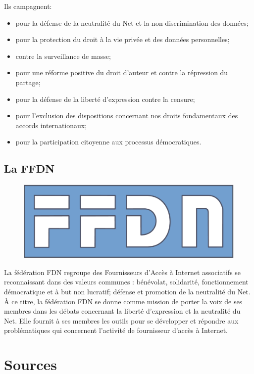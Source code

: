 \documentclass[a4paper,11pt,sf]{leaflet}
\begin{document}
Ils campagnent:
\begin{itemize}
\item pour la défense de la neutralité du Net et la non-discrimination
des données;
\item pour la protection du droit à la vie privée et des données
personnelles;
\item contre la surveillance de masse;
\item pour une réforme positive du droit d'auteur et contre la répression
du partage;
\item pour la défense de la liberté d'expression contre la censure;
\item pour l'exclusion des dispositions concernant nos droits fondamentaux
des accords internationaux;
\item pour la participation citoyenne aux processus démocratiques.
\end{itemize}

\subsection{La FFDN}\label{la-ffdn}

\begin{figure}
\includegraphics[width=\linewidth]{ffdn.png}
\end{figure}

La fédération FDN regroupe des Fournisseurs d'Accès à Internet
associatifs se reconnaissant dans des valeurs communes : bénévolat,
solidarité, fonctionnement démocratique et à but non lucratif; défense
et promotion de la neutralité du Net. À ce titre, la fédération FDN se
donne comme mission de porter la voix de ses membres dans les débats
concernant la liberté d'expression et la neutralité du Net. Elle fournit
à ses membres les outils pour se développer et répondre aux
problématiques qui concernent l'activité de fournisseur d'accès à
Internet.

\section{Sources}\label{sources}
\end{document}
